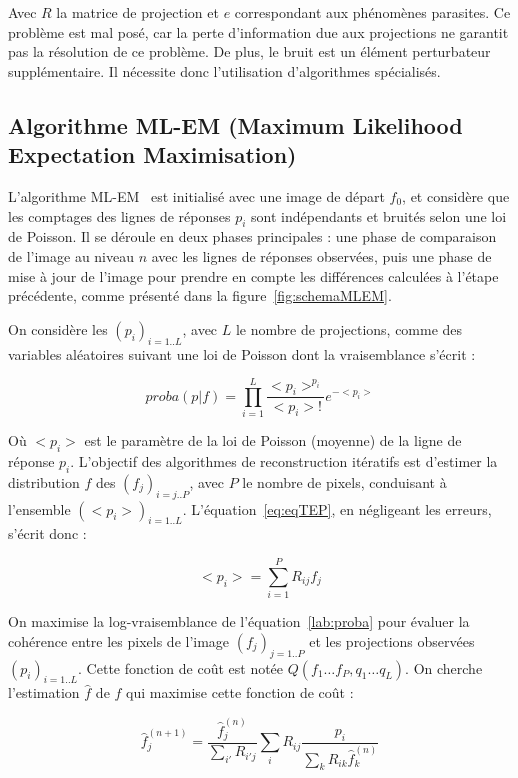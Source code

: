 Avec $R$ la matrice de projection et $e$ correspondant aux phénomènes parasites. Ce problème est mal posé, car la perte d'information due aux projections ne garantit pas la résolution de ce problème. De plus, le bruit est un élément perturbateur supplémentaire. Il nécessite donc l'utilisation d'algorithmes spécialisés. 


		\subsection{Algorithme ML-EM (Maximum Likelihood Expectation Maximisation) }


L'algorithme ML-EM~\cite{shepp1982maximum} est initialisé avec une image de départ $f_0$, et considère que les comptages des lignes de réponses $p_i$ sont indépendants et bruités selon une loi de Poisson. Il se déroule en deux phases principales : une phase de comparaison de l'image au niveau $n$ avec les lignes de réponses observées, puis une phase de mise à jour de l'image pour prendre en compte les différences calculées à l'étape précédente, comme présenté dans la figure~\ref{fig:schemaMLEM}.

On considère les $(p_i)_{i=1..L}$, avec $L$ le nombre de projections, comme des variables aléatoires suivant une loi de Poisson dont la vraisemblance s'écrit :

\begin{equation}
proba(p|f) = \prod\limits_{i=1}^{L} \frac{<p_i>^{p_i}}{<p_i> !} e^{-<p_i>}
\label{lab:proba}
\end{equation}

Où $<p_i>$ est le paramètre de la loi de Poisson (moyenne) de la ligne de réponse $p_i$. L'objectif des algorithmes de reconstruction itératifs est d'estimer la distribution $f$ des $(f_j)_{i=j..P}$, avec $P$ le nombre de pixels, conduisant à l'ensemble $(<p_i>)_{i=1..L}$. L'équation~\ref{eq:eqTEP}, en négligeant les erreurs, s'écrit donc :

\begin{equation}
<p_i> = \sum\limits_{i=1}^{P} R_{ij}f_j
\end{equation}

On maximise la log-vraisemblance de l'équation~\ref{lab:proba} pour évaluer la cohérence entre les pixels de l'image $(f_j)_{j=1..P}$ et les projections observées $(p_i)_{i=1..L}$. Cette fonction de coût est notée $Q(f_1 \dots f_P, q_1 \dots q_L)$. On cherche l'estimation $\hat{f}$ de $f$ qui maximise cette fonction de coût :

\begin{equation}
	\hat{f}_j^{(n+1)}=\frac{\hat{f}_j^{(n)}}{\sum\limits_{i'}R_{i'j}}\sum\limits_{i}R_{ij}\frac{p_i}{\sum\limits_{k}R_{ik}\hat{f}_k^{(n)}}
\label{eq:MLEM}
\end{equation}

